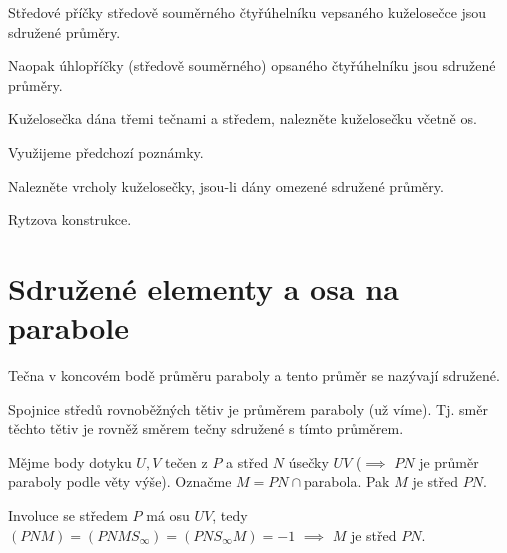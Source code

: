 \documentclass[12pt]{article}					%
\begin{document}
\begin{dusledek}
	Středové příčky středově souměrného čtyřúhelníku vepsaného kuželosečce jsou sdružené průměry.
\end{dusledek}

\begin{poznamka}
	Naopak úhlopříčky (středově souměrného) opsaného čtyřúhelníku jsou sdružené průměry.
\end{poznamka}

\begin{priklad}
	Kuželosečka dána třemi tečnami a středem, nalezněte kuželosečku včetně os.

	\begin{reseni}
		Využijeme předchozí poznámky.
	\end{reseni}
\end{priklad}

\begin{priklad}[Konstrukce]
	Nalezněte vrcholy kuželosečky, jsou-li dány omezené sdružené průměry.

	\begin{reseni}
		Rytzova konstrukce.
	\end{reseni}
\end{priklad}

\section{Sdružené elementy a osa na parabole}
\begin{definice}
	Tečna v koncovém bodě průměru paraboly a tento průměr se nazývají sdružené.
\end{definice}

\begin{poznamka}
	Spojnice středů rovnoběžných tětiv je průměrem paraboly (už víme). Tj. směr těchto tětiv je rovněž směrem tečny sdružené s tímto průměrem.
\end{poznamka}

\begin{veta}
	Mějme body dotyku $U, V$ tečen z $P$ a střed $N$ úsečky $UV$ ($\implies$ $PN$ je průměr paraboly podle věty výše). Označme $M = PN \cap $parabola. Pak $M$ je střed $PN$.

	\begin{dukazin}
		Involuce se středem $P$ má osu $UV$, tedy $(PNM) = (PNMS_∞) = (PNS_∞M) = -1$ $\implies$ $M$ je střed $PN$.
	\end{dukazin}
\end{veta}
\end{document}
